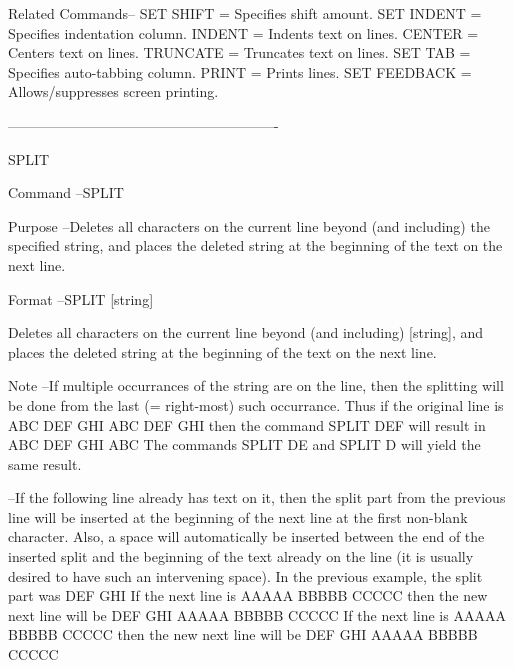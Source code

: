 Related Commands--
          SET SHIFT       = Specifies shift amount.
          SET INDENT      = Specifies indentation column.
          INDENT          = Indents text on lines.
          CENTER          = Centers text on lines.
          TRUNCATE        = Truncates text on lines.
          SET TAB         = Specifies auto-tabbing column.
          PRINT           = Prints lines.
          SET FEEDBACK    = Allows/suppresses screen printing.
 
 
----------------------------------------------------------
 
SPLIT
 
Command --SPLIT
 
Purpose --Deletes all characters on the current
          line beyond (and including) the
          specified string, and places the
          deleted string at the beginning
          of the text on the next line.
 
Format  --SPLIT   [string]
 
          Deletes all characters on the current
          line beyond (and including) [string],
          and places the deleted string at
          the beginning of the text on
          the next line.
 
Note    --If multiple occurrances of the string
          are on the line, then the splitting will
          be done from the last (= right-most) such
          occurrance.  Thus if the original line is
             ABC DEF GHI ABC DEF GHI
          then the command
             SPLIT DEF
          will result in
             ABC DEF GHI ABC
          The commands
             SPLIT DE
          and
             SPLIT D
          will yield the same result.
 
        --If the following line already has
          text on it, then the split part
          from the previous line will be
          inserted at the beginning of the
          next line at the first non-blank
          character.  Also, a space will
          automatically be inserted between
          the end of the inserted split
          and the beginning of the text already
          on the line (it is usually desired to
          have such an intervening space).  In
          the previous example, the split part was
             DEF GHI
          If the next line is
                AAAAA BBBBB CCCCC
          then the new next line will be
                DEF GHI AAAAA BBBBB CCCCC
          If the next line is
                         AAAAA BBBBB CCCCC
          then the new next line will be
                         DEF GHI AAAAA BBBBB CCCCC
 
